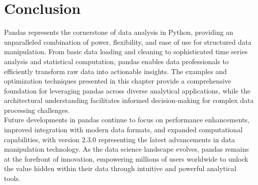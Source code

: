 \section{Conclusion}
\label{sec:conclusion}

Pandas represents the cornerstone of data analysis in Python, providing an unparalleled combination of power, flexibility, and ease of use for structured data manipulation. From basic data loading and cleaning to sophisticated time series analysis and statistical computation, pandas enables data professionals to efficiently transform raw data into actionable insights. The examples and optimization techniques presented in this chapter provide a comprehensive foundation for leveraging pandas across diverse analytical applications, while the architectural understanding facilitates informed decision-making for complex data processing challenges.\\

Future developments in pandas continue to focus on performance enhancements, improved integration with modern data formats, and expanded computational capabilities, with version 2.3.0 representing the latest advancements in data manipulation technology. As the data science landscape evolves, pandas remains at the forefront of innovation, empowering millions of users worldwide to unlock the value hidden within their data through intuitive and powerful analytical tools.